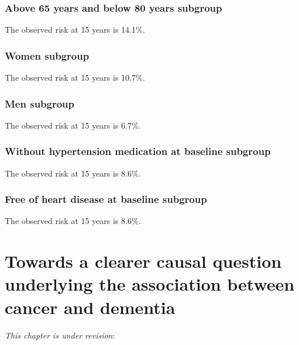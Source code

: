 \documentclass[
]{book}
\begin{document}
\hypertarget{above-65-years-and-below-80-years-subgroup-1}{%
\subsection{Above 65 years and below 80 years subgroup}\label{above-65-years-and-below-80-years-subgroup-1}}

The observed risk at 15 years is 14.1\%.

\hypertarget{women-subgroup-1}{%
\subsection{Women subgroup}\label{women-subgroup-1}}

The observed risk at 15 years is 10.7\%.

\hypertarget{men-subgroup-1}{%
\subsection{Men subgroup}\label{men-subgroup-1}}

The observed risk at 15 years is 6.7\%.

\hypertarget{without-hypertension-medication-at-baseline-subgroup-1}{%
\subsection{Without hypertension medication at baseline subgroup}\label{without-hypertension-medication-at-baseline-subgroup-1}}

The observed risk at 15 years is 8.6\%.

\hypertarget{free-of-heart-disease-at-baseline-subgroup}{%
\subsection{Free of heart disease at baseline subgroup}\label{free-of-heart-disease-at-baseline-subgroup}}

The observed risk at 15 years is 8.6\%.

\hypertarget{chapter4}{%
\chapter{Towards a clearer causal question underlying the association between cancer and dementia}\label{chapter4}}


\small

\noindent
\emph{This chapter is under revision}:
\end{document}
